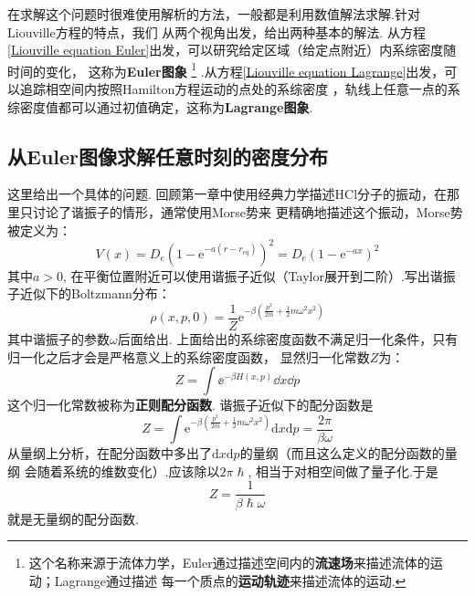     在求解这个问题时很难使用解析的方法，一般都是利用数值解法求解.针对Liouville方程的特点，我们
    从两个视角出发，给出两种基本的解法.
    从方程\ref{Liouville equation Euler}出发，可以研究给定区域（给定点附近）内系综密度随时间的变化，
    这称为\textbf{Euler图象}
    \footnote{这个名称来源于流体力学，Euler通过描述空间内的\textbf{流速场}来描述流体的运动；Lagrange通过描述
    每一个质点的\textbf{运动轨迹}来描述流体的运动.}
    .从方程\ref{Liouville equation Lagrange}出发，可以追踪相空间内按照Hamilton方程运动的点处的系综密度
    ，轨线上任意一点的系综密度值都可以通过初值确定，这称为\textbf{Lagrange图象}.

    \subsection{从Euler图像求解任意时刻的密度分布}
    这里给出一个具体的问题.
    回顾第一章中使用经典力学描述HCl分子的振动，在那里只讨论了谐振子的情形，通常使用Morse势来
    更精确地描述这个振动，Morse势被定义为：
    \begin{equation}
        V(x) = D_e (1- \mathrm{e}^{-a(r-r_\mathrm{eq})})^2 = D_e(1-\mathrm{e}^{-ax})^2
    \end{equation}
    其中$a>0$, 在平衡位置附近可以使用谐振子近似（Taylor展开到二阶）.写出谐振子近似下的Boltzmann分布：
    \begin{equation}
        \rho(x,p,0) = \frac {1}{Z} \mathrm{e}^{-\beta (\frac {p^2}{2m} + \frac 12 m\omega^2 x^2)} 
    \end{equation}
    其中谐振子的参数$\omega$后面给出.
    上面给出的系综密度函数不满足归一化条件，只有归一化之后才会是严格意义上的系综密度函数，
    显然归一化常数$Z$为：
    \begin{equation}
        Z = \int\ee^{-\beta H(x, p)}\dd x\dd p
    \end{equation}
    这个归一化常数被称为\textbf{正则配分函数}.
    谐振子近似下的配分函数是
    \begin{equation}
        Z = \int \mathrm{e}^{-\beta (\frac {p^2}{2m} + \frac 12 m\omega^2 x^2)} \mathrm{d}x\mathrm{d}p = \frac {2\pi}{\beta \omega}
    \end{equation}
    从量纲上分析，在配分函数中多出了$\mathrm{d}x\mathrm{d}p$的量纲（而且这么定义的配分函数的量纲
    会随着系统的维数变化）.应该除以$2\pi\hslash$, 相当于对相空间做了量子化.于是
    \begin{equation}
        Z = \frac 1{\beta \hslash \omega}
    \end{equation}
    就是无量纲的配分函数.
    \par 
